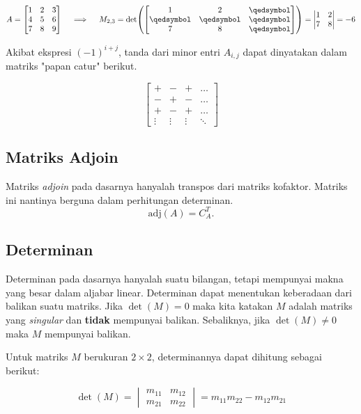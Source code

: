 \[ A = \begin{bmatrix}
    1 & 2 & 3 \\
    4 & 5 & 6 \\
    7 & 8 & 9
\end{bmatrix} \quad \implies \quad 
M_{2,3} = \det(\begin{bmatrix}
    1 & 2 & \qedsymbol \\
    \qedsymbol & \qedsymbol & \qedsymbol \\
    7 & 8 & \qedsymbol 
\end{bmatrix}) = 
    \begin{vmatrix}
        1 & 2 \\
        7 & 8 
    \end{vmatrix}
    = -6 \]

Akibat ekspresi $(-1)^{i+j}$, tanda dari minor entri $A_{i, j}$ dapat dinyatakan dalam matriks "papan catur" berikut.

\[ \begin{bmatrix}
    + & - & + & \ldots \\
    - & + & - & \ldots \\
    + & - & + & \ldots \\
    \vdots & \vdots & \vdots & \ddots 
\end{bmatrix}\]

\subsection{Matriks Adjoin}
Matriks \textit{adjoin} pada dasarnya hanyalah transpos dari matriks kofaktor. Matriks ini nantinya berguna dalam perhitungan determinan.
\[\mathrm{adj}(A) = C_A^T. \]

\subsection{Determinan}
    Determinan pada dasarnya hanyalah suatu bilangan, tetapi mempunyai makna yang besar dalam aljabar linear. Determinan dapat menentukan keberadaan dari balikan suatu matriks. Jika $\det(M) = 0$ maka kita katakan $M$ adalah matriks yang \textit{singular} dan \textbf{tidak} mempunyai balikan. Sebaliknya, jika $\det(M) \neq 0$ maka $M$ mempunyai balikan.

    Untuk matriks $M$ berukuran $2 \times 2$, determinannya dapat dihitung sebagai berikut:

    \[
        \det(M) = 
        \begin{vmatrix}
            m_{11} & m_{12} \\
            m_{21} & m_{22}
        \end{vmatrix}
        =
        m_{11} m_{22} - m_{12} m_{21}
    \]

